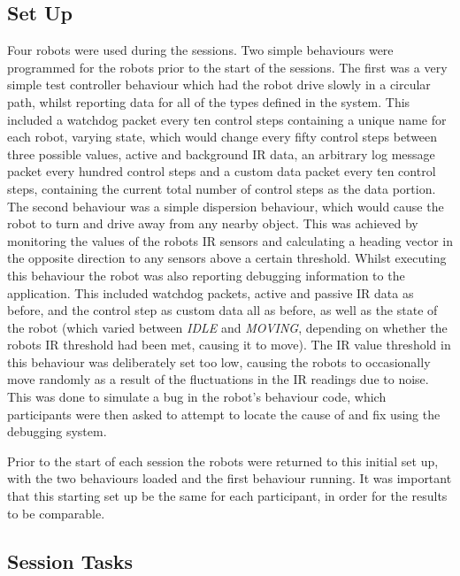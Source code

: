 \subsection{Set Up}
Four robots were used during the sessions. Two simple behaviours were programmed for the robots prior to the start of the sessions. The first was a very simple test controller behaviour which had the robot drive slowly in a circular path, whilst reporting data for all of the types defined in the system. This included a watchdog packet every ten control steps containing a unique name for each robot,  varying state, which would change every fifty control steps between three possible values, active and background IR data, an arbitrary log message packet every hundred control steps and a custom data packet every ten control steps, containing the current total number of control steps as the data portion. The second behaviour was a simple dispersion behaviour, which would cause the robot to turn and drive away from any nearby object. This was achieved by monitoring the values of the robots IR sensors and calculating a heading vector in the opposite direction to any sensors above a certain threshold. Whilst executing this behaviour the robot was also reporting debugging information to the application. This included watchdog packets, active and passive IR data as before, and the control step as custom data all as before, as well as the state of the robot (which varied between \textit{IDLE} and \textit{MOVING}, depending on whether the robots IR threshold had been met, causing it to move). The IR value threshold in this behaviour was deliberately set too low, causing the robots to occasionally move randomly as a result of the fluctuations in the IR readings due to noise. This was done to simulate a bug in the robot's behaviour code, which participants were then asked to attempt to locate the cause of and fix using the debugging system.

Prior to the start of each session the robots were returned to this initial set up, with the two behaviours loaded and the first behaviour running. It was important that this starting set up be the same for each participant, in order for the results to be comparable.

\subsection{Session Tasks}




